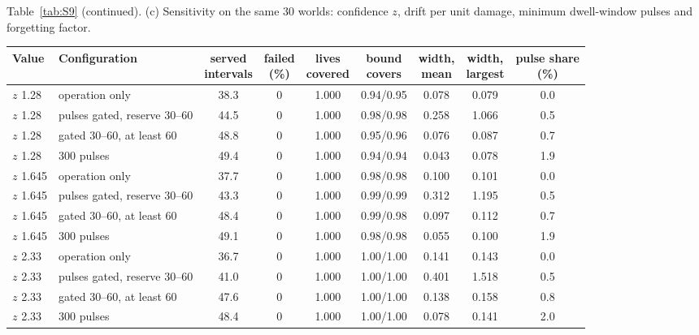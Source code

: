 \begin{table}[htbp]
\centering
\small Table~\ref{tab:S9} (continued). (c) Sensitivity on the same 30 worlds: confidence $z$, drift per unit damage,
minimum dwell-window pulses and forgetting factor.\par\medskip
\scriptsize
\setlength{\tabcolsep}{2.5pt}
\begin{tabular*}{\textwidth}{@{\extracolsep{\fill}}llccccccc@{}}
\toprule
Value & Configuration & \makecell{served\\intervals} & \makecell{failed\\(\%)} & \makecell{lives\\covered} &
\makecell{bound\\covers} & \makecell{width,\\mean} & \makecell{width,\\largest} & \makecell{pulse share\\(\%)} \\
\midrule
$z$ 1.28 & operation only & 38.3 & 0 & 1.000 & 0.94/0.95 & 0.078 & 0.079 & 0.0 \\
$z$ 1.28 & pulses gated, reserve 30--60 & 44.5 & 0 & 1.000 & 0.98/0.98 & 0.258 & 1.066 & 0.5 \\
$z$ 1.28 & gated 30--60, at least 60 & 48.8 & 0 & 1.000 & 0.95/0.96 & 0.076 & 0.087 & 0.7 \\
$z$ 1.28 & 300 pulses & 49.4 & 0 & 1.000 & 0.94/0.94 & 0.043 & 0.078 & 1.9 \\
$z$ 1.645 & operation only & 37.7 & 0 & 1.000 & 0.98/0.98 & 0.100 & 0.101 & 0.0 \\
$z$ 1.645 & pulses gated, reserve 30--60 & 43.3 & 0 & 1.000 & 0.99/0.99 & 0.312 & 1.195 & 0.5 \\
$z$ 1.645 & gated 30--60, at least 60 & 48.4 & 0 & 1.000 & 0.99/0.98 & 0.097 & 0.112 & 0.7 \\
$z$ 1.645 & 300 pulses & 49.1 & 0 & 1.000 & 0.98/0.98 & 0.055 & 0.100 & 1.9 \\
$z$ 2.33 & operation only & 36.7 & 0 & 1.000 & 1.00/1.00 & 0.141 & 0.143 & 0.0 \\
$z$ 2.33 & pulses gated, reserve 30--60 & 41.0 & 0 & 1.000 & 1.00/1.00 & 0.401 & 1.518 & 0.5 \\
$z$ 2.33 & gated 30--60, at least 60 & 47.6 & 0 & 1.000 & 1.00/1.00 & 0.138 & 0.158 & 0.8 \\
$z$ 2.33 & 300 pulses & 48.4 & 0 & 1.000 & 1.00/1.00 & 0.078 & 0.141 & 2.0 \\

\end{tabular*}
\end{table}
